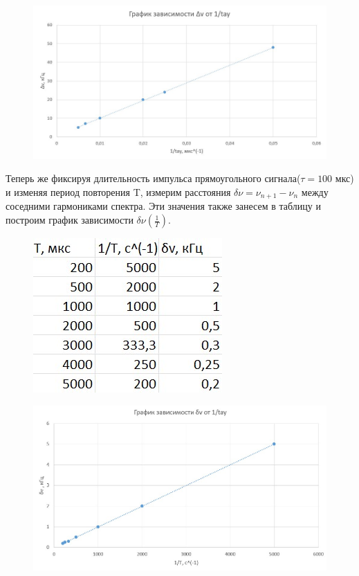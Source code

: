 \documentclass[a4paper,12pt]{article}
\begin{document}
\begin{figure}[H]
	\begin{center}
    \includegraphics[width=.8\textwidth]{A.8.graph}
\label{fig:foobar}
	\end{center}
\end{figure}

Теперь же фиксируя длительность импульса прямоугольного сигнала($\tau = 100$ мкс) и изменяя период повторения T, измерим расстояния $\delta \nu = \nu_{n+1} - \nu_n$ между соседними гармониками спектра. Эти значения также занесем в таблицу и построим график зависимости $\delta \nu(\frac{1}{T})$.


\begin{figure}[H]
	\begin{center}
    \includegraphics[width=.3\textwidth]{A.9.tabl}
\label{fig:foobar}
	\end{center}
\end{figure}

\begin{figure}[H]
	\begin{center}
    \includegraphics[width=.8\textwidth]{A.9.graph}
\label{fig:foobar}
	\end{center}
\end{figure}
\end{document}
